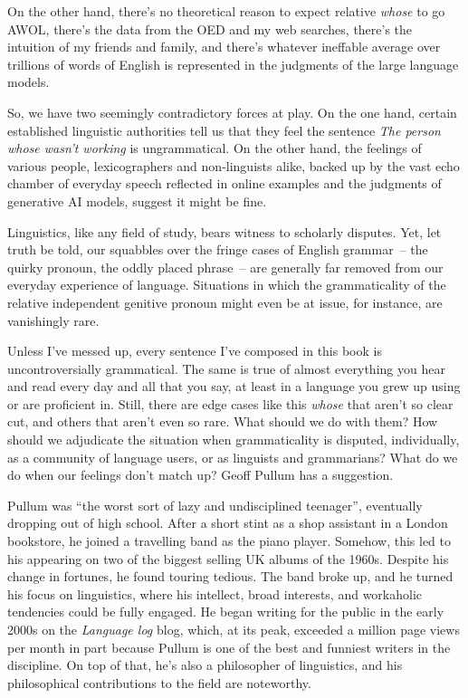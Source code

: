 On the other hand, there's no theoretical reason to expect relative \textit{whose} to go AWOL, there's the data from the OED and my web searches, there's the intuition of my friends and family, and there's whatever ineffable average over trillions of words of English is represented in the judgments of the large language models.

So, we have two seemingly contradictory forces at play. On the one hand, certain established linguistic authorities tell us that they feel the sentence \textit{The person whose wasn't working} is ungrammatical. On the other hand, the feelings of various people, lexicographers and non-linguists alike, backed up by the vast echo chamber of everyday speech reflected in online examples and the judgments of generative AI models, suggest it might be fine.

\bigskip

Linguistics, like any field of study, bears witness to scholarly disputes. Yet, let truth be told, our squabbles over the fringe cases of English grammar~-- the quirky pronoun, the oddly placed phrase~-- are generally far removed from our everyday experience of language. Situations in which the grammaticality of the relative independent genitive pronoun might even be at issue, for instance, are vanishingly rare.

Unless I've messed up, every sentence I've composed in this book is uncontroversially grammatical. The same is true of almost everything you hear and read every day and all that you say, at least in a language you grew up using or are proficient in. Still, there are edge cases like this \textit{whose} that aren't so clear cut, and others that aren't even so rare. What should we do with them? How should we adjudicate the situation when grammaticality is disputed, individually, as a community of language users, or as linguists and grammarians? What do we do when our feelings don't match up? Geoff Pullum has a suggestion.

Pullum was \enquote{the worst sort of lazy and undisciplined teenager}, eventually dropping out of high school. After a short stint as a shop assistant in a London bookstore, he joined a travelling band as the piano player. Somehow, this led to his appearing on two of the biggest selling UK albums of the 1960s. Despite his change in fortunes, he found touring tedious. The band broke up, and he turned his focus on linguistics, where his intellect, broad interests, and workaholic tendencies could be fully engaged. He began writing for the public in the early 2000s on the \textit{Language log} blog, which, at its peak, exceeded a million page views per month in part because Pullum is one of the best and funniest writers in the discipline. On top of that, he's also a philosopher of linguistics, and his philosophical contributions to the field are noteworthy.

